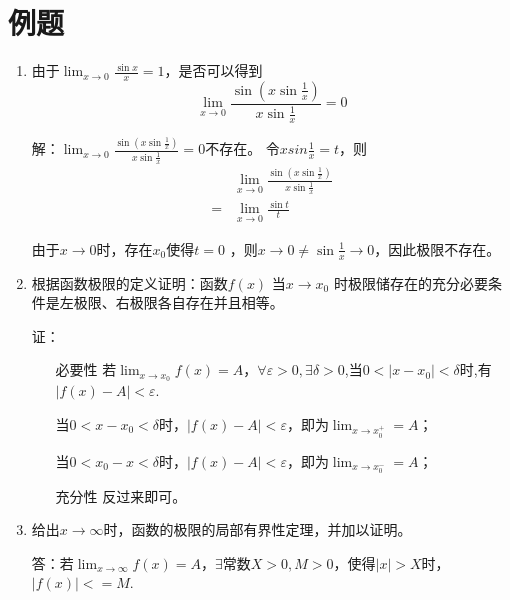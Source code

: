 \documentclass[UTF8]{ctexart}
\begin{document}
	\section{例题}
		\begin{enumerate}
			\item 
			由于$\lim_{x\rightarrow 0} \frac{\sin x}{x}=1$，是否可以得到
			$$
			\lim _{x\rightarrow 0}
			\frac{\sin(x\sin {\frac{1}{x}})}
			{x\sin{\frac{1}{x}}}=0
			$$
			
			解：$
			\lim _{x\rightarrow 0}
			\frac{\sin(x\sin {\frac{1}{x}})}
			{x\sin{\frac{1}{x}}}=0
			$不存在。	
			令$xsin \frac{1}{x}=t$，则
			\begin{equation}
				\begin{split}
					&\lim _{x\rightarrow 0}
					\frac{\sin(x\sin {\frac{1}{x}})}
					{x\sin{\frac{1}{x}}}\\
					=&\lim _{x\rightarrow 0}
					\frac{\sin t}{t}
				\end{split}
			\end{equation}
			
			由于$x\rightarrow 0$时，存在$x_0$使得$t=0$
			，则$x\rightarrow 0\neq \sin{\frac{1}{x} \rightarrow 0}$，因此极限不存在。
			
			\item 
			
			根据函数极限的定义证明：函数$f(x)$ 当$x\rightarrow x_0$ 时极限储存在的充分必要条件是左极限、右极限各自存在并且相等。
			
			证：
			\begin{itemize}
				\item [必要性] 若$\lim _{x\rightarrow x_0}f(x)=A$，$\forall \varepsilon > 0, \exists \delta > 0$,当$0<|x-x_0|<\delta$时,有$|f(x)-A|<\varepsilon$.
				
				当$0<x-x_0<\delta$时，$|f(x)-A|<\varepsilon$，即为$\lim _{x \rightarrow x_0^+}=A$；
				
				当$0<x_0-x<\delta$时，$|f(x)-A|<\varepsilon$，即为$\lim _{x \rightarrow x_0^-}=A$；
				
				
				\item [充分性] 反过来即可。
			\end{itemize} 
			
			\item 给出$x\rightarrow \infty$时，函数的极限的局部有界性定理，并加以证明。
			
			答：若$\lim _{x\rightarrow \infty}f(x)=A$，$\exists$常数$ X > 0,M>0$，使得$|x|>X$时，$|f(x)|<=M$.
			

\end{enumerate}
\end{document}
